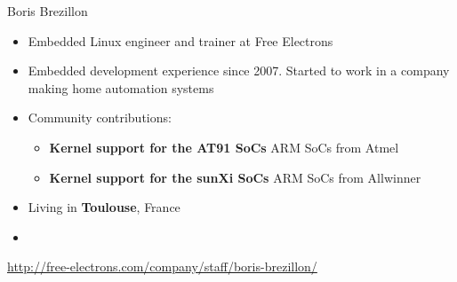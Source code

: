\begin{frame}{Boris Brezillon}
    \begin{itemize}
	\item Embedded Linux engineer and trainer at Free Electrons
	\item Embedded development experience since 2007. Started
	      to work in a company making home automation systems
        \item Community contributions:
	\begin{itemize}
		\item {\bf Kernel support for the AT91 SoCs} ARM SoCs from Atmel
		\item {\bf Kernel support for the sunXi SoCs} ARM SoCs from Allwinner
	\end{itemize}
	\item Living in {\bf Toulouse}, France
	\item {}
    \end{itemize}
    {\small \url{http://free-electrons.com/company/staff/boris-brezillon/}}
\end{frame}
